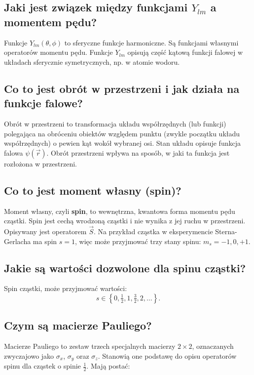 \subsection{Jaki jest związek między funkcjami $Y_{lm}$ a momentem pędu?}

Funkcje \( Y_{lm}(\theta, \phi) \) to sferyczne funkcje harmoniczne. Są funkcjami własnymi operatorów momentu pędu. Funkcje \( Y_{lm} \) opisują część kątową funkcji falowej w układach sferycznie symetrycznych, np. w atomie wodoru.

\subsection{Co to jest obrót w przestrzeni i jak działa na funkcje falowe?}

Obrót w przestrzeni to transformacja układu współrzędnych (lub funkcji) polegająca na obróceniu obiektów względem punktu (zwykle początku układu współrzędnych) o pewien kąt wokół wybranej osi. Stan układu opisuje funkcja falowa $\psi(\vec{r})$. Obrót przestrzeni wpływa na sposób, w jaki ta funkcja jest rozłożona w przestrzeni.

\subsection{Co to jest moment własny (spin)?}

Moment własny, czyli \textbf{spin}, to wewnętrzna, kwantowa forma momentu pędu cząstki. Spin jest cechą wrodzoną cząstki i nie wynika z jej ruchu w przestrzeni. Opisywany jest operatorem $\vec{S}$. Na przykład cząstka w eksperymencie Sterna-Gerlacha ma spin \( s = 1 \), więc może przyjmować trzy stany spinu: \( m_s = -1, 0, +1 \).

\subsection{Jakie są wartości dozwolone dla spinu cząstki?}

Spin cząstki, może przyjmować wartości:
\[
s \in \left\{ 0, \tfrac{1}{2}, 1, \tfrac{3}{2}, 2, \dots \right\}.
\]

\subsection{Czym są macierze Pauliego?}

Macierze Pauliego to zestaw trzech specjalnych macierzy \( 2 \times 2 \), oznaczanych zwyczajowo jako \( \sigma_x \), \( \sigma_y \) oraz \( \sigma_z \). Stanowią one podstawę do opisu operatorów spinu dla cząstek o spinie \( \frac{1}{2} \). Mają postać:


